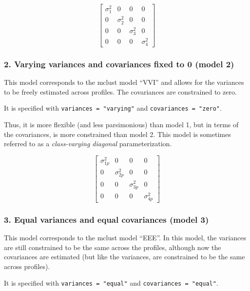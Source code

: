 \documentclass[man]{apa6}
\begin{document}
\[
\left[ \begin{matrix} { \sigma  }_{ 1 }^{ 2 } & 0 & 0 & 0 \\ 0 & { \sigma  }_{ 2 }^{ 2 } & 0 & 0 \\ 0 & 0 & { \sigma  }_{ 3 }^{ 2 } & 0 \\ 0 & 0 & 0 & { \sigma  }_{ 4 }^{ 2 } \end{matrix} \right] 
\]

\hypertarget{varying-variances-and-covariances-fixed-to-0-model-2}{%
\subsubsection{2. Varying variances and covariances fixed to 0 (model 2)}\label{varying-variances-and-covariances-fixed-to-0-model-2}}

This model corresponds to the mclust model \enquote{VVI} and allows for the variances to be freely estimated across profiles. The covariances are constrained to zero.

It is specified with \texttt{variances\ =\ "varying"} and \texttt{covariances\ =\ "zero"}.

Thus, it is more flexible (and less parsimonious) than model 1, but in terms of the covariances, is more constrained than model 2. This model is sometimes referred to as a \emph{class-varying diagonal} parameterization.

\[ 
\left[ \begin{matrix} { \sigma  }_{ 1p }^{ 2 } & 0 & 0 & 0 \\ 0 & { \sigma  }_{ 2p }^{ 2 } & 0 & 0 \\ 0 & 0 & { \sigma  }_{ 3p }^{ 2 } & 0 \\ 0 & 0 & 0 & { \sigma  }_{ 4p }^{ 2 } \end{matrix} \right] 
\]

\hypertarget{equal-variances-and-equal-covariances-model-3}{%
\subsubsection{3. Equal variances and equal covariances (model 3)}\label{equal-variances-and-equal-covariances-model-3}}

This model corresponds to the mclust model \enquote{EEE}. In this model, the variances are still constrained to be the same across the profiles, although now the covariances are estimated (but like the variances, are constrained to be the same across profiles).

It is specified with \texttt{variances\ =\ "equal"} and \texttt{covariances\ =\ "equal"}.
\end{document}
